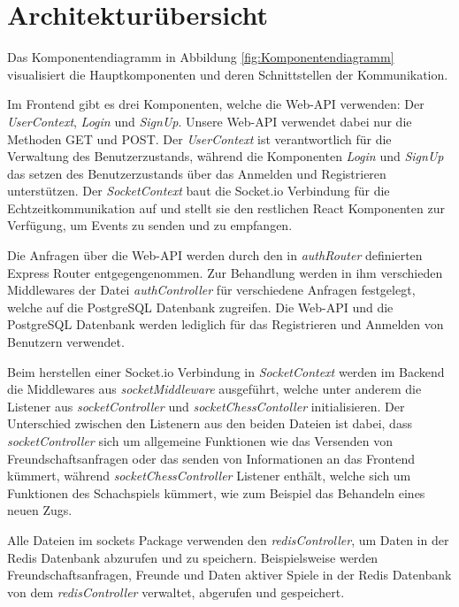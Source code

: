 \documentclass[a4paper,12pt]{report}
\begin{document}
\section{Architekturübersicht}
Das Komponentendiagramm in Abbildung \ref{fig:Komponentendiagramm} visualisiert die Hauptkomponenten und deren Schnittstellen der Kommunikation.

Im Frontend gibt es drei Komponenten, welche die Web-API verwenden: Der \textit{UserContext}, \textit{Login} und \textit{SignUp}. Unsere Web-API verwendet dabei nur die Methoden GET und POST. Der \textit{UserContext} ist verantwortlich für die Verwaltung des Benutzerzustands, während die Komponenten \textit{Login} und \textit{SignUp} das setzen des Benutzerzustands über das Anmelden und Registrieren unterstützen. Der \textit{SocketContext} baut die Socket.io Verbindung für die Echtzeitkommunikation auf und stellt sie den restlichen React Komponenten zur Verfügung, um Events zu senden und zu empfangen.

Die Anfragen über die Web-API werden durch den in \textit{authRouter} definierten Express Router entgegengenommen. Zur Behandlung werden in ihm verschieden Middlewares der Datei \textit{authController} für verschiedene Anfragen festgelegt, welche auf die PostgreSQL Datenbank zugreifen. Die Web-API und die PostgreSQL Datenbank werden lediglich für das Registrieren und Anmelden von Benutzern verwendet.

Beim herstellen einer Socket.io Verbindung in \textit{SocketContext} werden im Backend die Middlewares aus \textit{socketMiddleware} ausgeführt, welche unter anderem die Listener aus \textit{socketController} und \textit{socketChessContoller} initialisieren. Der Unterschied zwischen den Listenern aus den beiden Dateien ist dabei, dass \textit{socketController} sich um allgemeine Funktionen wie das Versenden von Freundschaftsanfragen oder das senden von Informationen an das Frontend kümmert, während \textit{socketChessController} Listener enthält, welche sich um Funktionen des Schachspiels kümmert, wie zum Beispiel das Behandeln eines neuen Zugs. 

Alle Dateien im sockets Package verwenden den \textit{redisController}, um Daten in der Redis Datenbank abzurufen und zu speichern. Beispielsweise werden Freundschaftsanfragen, Freunde und Daten aktiver Spiele in der Redis Datenbank von dem \textit{redisController} verwaltet, abgerufen und gespeichert.
\end{document}

